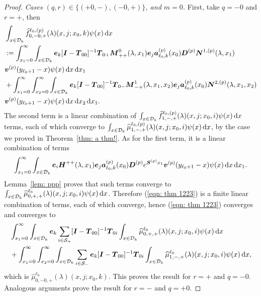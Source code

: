\begin{proof}
	\textit{Cases \((q,r) \in \{(+0,-),(-0,+)\}\), and \(m=0\).} First, take \(q=-0\) and \(r=+\), then 
	\begin{align}
		&\int_{x\in\mathcal{D}_k}\widehat{f}_{0,-0,+}^{\ell_0,(p)}(\lambda)(x,j;x_0,k)\psi(x)\, \mathrm{d} x \nonumber 
		\\&:=\int_{x_1=0}^\infty \int_{x\in\mathcal{D}_k} \boldsymbol e_k [\boldsymbol I - \boldsymbol T_{00}]^{-1}\boldsymbol T_{0+} \boldsymbol M^0_{++}(\lambda,x_1)\boldsymbol e_j \nonumber
		\boldsymbol a_{\ell_0,k}^{(p)}(x_0) \boldsymbol D^{(p)} \boldsymbol N^{1,(p)}(\lambda,x_1) 
		\\& {\boldsymbol v}^{(p)}(y_{\ell_0+1}-x)\psi(x)\, \mathrm{d} x\, \mathrm{d} x_{1}  \nonumber
		\\& + \int_{x_1=0}^\infty\int_{x_2=0}^\infty \int_{x\in\mathcal{D}_k}  \boldsymbol e_k [\boldsymbol I - \boldsymbol T_{00}]^{-1}\boldsymbol T_{0-} \boldsymbol M^1_{-+}(\lambda,x_1,x_{2})\boldsymbol e_j \nonumber
		\boldsymbol a_{\ell_0,k}^{(p)}(x_0)\boldsymbol N^{2,(p)}(\lambda,x_1,x_{2}) 
		\\& {\boldsymbol v}^{(p)}(y_{\ell_0+1}-x)\psi(x)\, \mathrm{d} x\, \mathrm{d} x_{2} \, \mathrm{d} x_1. \label{eqn: thm 1223}
	\end{align}
	The second term is a linear combination of \(\int_{x\in\mathcal{D}_k}\widehat{f}_{1,-,+}^{\ell_0,(p)}(\lambda)(x,j;x_0,i) \psi(x)\, \mathrm{d} x\) terms, each of which converge to \(\int_{x\in\mathcal{D}_k}\widehat{\mu}_{1,-,+}^{\ell_0,(p)}(\lambda)(x,j;x_0,i) \psi(x)\, \mathrm{d} x\), by the case we proved in Theorem~\ref{thm: a thm!}. As for the first term, it is a linear combination of terms
	\[\int_{x_1=0}^\infty \int_{x\in\mathcal{D}_k} \boldsymbol e_i \boldsymbol H^{++}(\lambda,x_1)\boldsymbol e_j \nonumber
	\boldsymbol a_{\ell_0,k}^{(p)}(x_0) \boldsymbol D^{(p)} e^{\boldsymbol S^{(p)}x_1} 
	{\boldsymbol v}^{(p)}(y_{\ell_0+1}-x)\psi(x)\, \mathrm{d} x\, \mathrm{d} x_{1}.\]
	Lemma~\ref{lem: ppp} proves that such terms converge to \(\int_{x\in\mathcal{D}_k}\widehat{\mu}_{0,+,+}^{\ell_0}(\lambda)(x,j;x_0,i) \psi(x)\, \mathrm{d} x\). Therefore (\ref{eqn: thm 1223}) is a finite linear combination of terms, each of which converge, hence (\ref{eqn: thm 1223}) converges and converges to 
	\begin{align}
		&\int_{x_1=0}^\infty \int_{x\in\mathcal{D}_k} \boldsymbol e_k \sum_{i\in\mathcal{S}_+} [\boldsymbol I - \boldsymbol T_{00}]^{-1}\boldsymbol T_{0i}\int_{x\in\mathcal{D}_k}\widehat{\mu}_{0,+,+}^{\ell_0}(\lambda)(x,j;x_0,i) \psi(x)\, \mathrm{d} x \nonumber
		\\& + \int_{x_1=0}^\infty\int_{x_2=0}^\infty \int_{x\in\mathcal{D}_k} \sum_{i\in\mathcal{S}_-}\boldsymbol e_k [\boldsymbol I - \boldsymbol T_{00}]^{-1}\boldsymbol T_{0i}\int_{x\in\mathcal{D}_k}\widehat{\mu}_{1,-,+}^{\ell_0}(\lambda)(x,j;x_0,i) \psi(x)\, \mathrm{d} x, \label{eqn: thm 1223B}
	\end{align}
	which is \(\widehat{\mu}_{0,-0,+}^{\ell_0}(\lambda)(x,j;x_0,k)\). This proves the result for \(r=+\) and \(q=-0\). Analogous arguments prove the result for \(r=-\) and \(q=+0\).


\end{proof}
